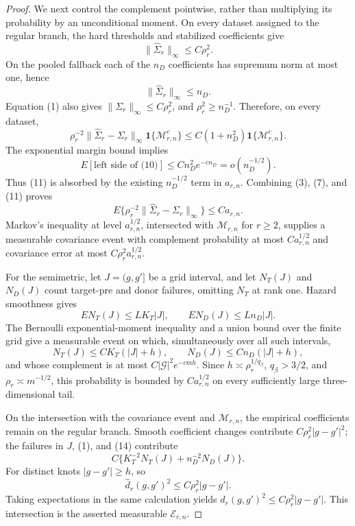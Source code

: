 \documentclass{article}
\begin{document}
\begin{proof}
We next control the complement pointwise, rather than multiplying its probability by an unconditional moment.  On every dataset assigned to the regular branch, the hard thresholds and stabilized coefficients give
\[
 \|\widehat\Sigma_r\|_\infty\le C\rho_r^2.            \tag{8}
\]
On the pooled fallback each of the \(n_D\) coefficients has supremum norm at most one, hence
\[
 \|\widehat\Sigma_r\|_\infty\le n_D.                  \tag{9}
\]
Equation (1) also gives \(\|\Sigma_r\|_\infty\le C\rho_r^2\), and \(\rho_r^2\ge n_D^{-1}\).  Therefore, on every dataset,
\[
 \rho_r^{-2}\|\widehat\Sigma_r-\Sigma_r\|_\infty
 \mathbf1\{\mathcal M_{r,n}^c\}
 \le C(1+n_D^2)\mathbf1\{\mathcal M_{r,n}^c\}.        \tag{10}
\]
The exponential margin bound implies
\[
 E[\text{left side of (10)}]
 \le Cn_D^2e^{-cn_D}=o(n_D^{-1/2}).                    \tag{11}
\]
Thus (11) is absorbed by the existing \(n_D^{-1/2}\) term in \(a_{r,n}\).  Combining (3), (7), and (11) proves
\[
 E\{\rho_r^{-2}\|\widehat\Sigma_r-\Sigma_r\|_\infty\}
 \le Ca_{r,n}.                                          \tag{12}
\]
Markov's inequality at level \(a_{r,n}^{1/2}\), intersected with \(\mathcal M_{r,n}\) for \(r\ge2\), supplies a measurable covariance event with complement probability at most \(Ca_{r,n}^{1/2}\) and covariance error at most \(C\rho_r^2a_{r,n}^{1/2}\).

For the semimetric, let \(J=(g,g']\) be a grid interval, and let \(N_T(J)\) and \(N_D(J)\) count target-pre and donor failures, omitting \(N_T\) at rank one.  Hazard smoothness gives
\[
 EN_T(J)\le LK_T|J|,
 \qquad EN_D(J)\le Ln_D|J|.                             \tag{13}
\]
The Bernoulli exponential-moment inequality and a union bound over the finite grid give a measurable event on which, simultaneously over all such intervals,
\[
 N_T(J)\le CK_T(|J|+h),
 \qquad N_D(J)\le Cn_D(|J|+h),                           \tag{14}
\]
and whose complement is at most \(C|\mathcal G|^2e^{-cmh}\).  Since \(h\asymp\rho_r^{1/q_\beta}\), \(q_\beta>3/2\), and \(\rho_r\asymp m^{-1/2}\), this probability is bounded by \(Ca_{r,n}^{1/2}\) on every sufficiently large three-dimensional tail.

On the intersection with the covariance event and \(\mathcal M_{r,n}\), the empirical coefficients remain on the regular branch.  Smooth coefficient changes contribute \(C\rho_r^2|g-g'|^2\); the failures in \(J\), (1), and (14) contribute
\[
 C\{K_T^{-2}N_T(J)+n_D^{-2}N_D(J)\}.
\]
For distinct knots \(|g-g'|\ge h\), so
\[
 \widehat d_r(g,g')^2\le C\rho_r^2|g-g'|.              \tag{15}
\]
Taking expectations in the same calculation yields \(d_r(g,g')^2\le C\rho_r^2|g-g'|\).  This intersection is the asserted measurable \(\mathcal E_{r,n}\).


\end{proof}
\end{document}
